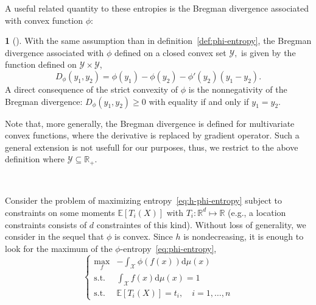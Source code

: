 \documentclass[english,sort&compress]{elsarticle}
\theoremstyle{definition}
\newtheorem{defn}{\protect\definitionname}
\theoremstyle{plain}
\theoremstyle{plain}
\providecommand{\definitionname}{Definition}
\def\dmu{\mathrm{d}\mu}
\def\Rset{\mathbb{R}}
\def\X{\mathcal{X}}
\def\Y{\mathcal{Y}}
\newcommand{\Esp}[1]{\mathbb{E}\left[ #1 \right]}
\begin{document}
A  useful  related  quantity  to  these  entropies  is  the  Bregman  divergence
associated with convex function $\phi$:
%
\begin{defn}[\cite{Bre67, Bas13}]
\label{def:Bregman}
  With the same assumption than in definition~\ref{def:phi-entropy}, the Bregman
  divergence  associated with $\phi$  defined on  a closed  convex set  $\Y,$ is
  given by the function defined on $\Y \times \Y$,
  \begin{equation}\label{eq:Bregman}
    D_\phi(y_1,y_2) = \phi(y_1) - \phi(y_2) - \phi'(y_2) \left(y_1-y_2\right).
  \end{equation}
  A direct consequence of the strict convexity of $\phi$ is the nonnegativity of
  the Bregman divergence:  $D_\phi(y_1,y_2) \ge 0$ with equality  if and only if
  $y_1 = y_2$.
\end{defn}

Note that,  more generally, the  Bregman divergence is defined  for multivariate
convex functions, where the derivative  is replaced by gradient operator. Such a
general extension  is not  usefull for  our purposes, thus,  we restrict  to the
above definition where $\Y \subseteq \Rset_+$.

\

Consider the  problem of maximizing  entropy~\eqref{eq:h-phi-entropy} subject to
constraints  on some moments  $\Esp{T_i(X)}$ with  $T_i: \Rset^d  \mapsto \Rset$
(e.g.,   a  location   constraints  consists   of  $d$   constraintes   of  this
kind). Without  loss of  generality, we  consider in the  sequel that  $\phi$ is
convex.  Since $h$ is nondecreasing, it is enough to look for the maximum of the
$\phi$-entropy~\eqref{eq:phi-entropy},
%
\begin{equation}\label{eq:MaxEnt}
\begin{cases}
\max_f & \displaystyle - \int_\X \phi(f(x)) \dmu(x)\\[5mm]
\text{s.t. } & \displaystyle \int_\X f(x) \dmu(x) = 1\\[5mm]
\text{s.t. } & \Esp{T_i(X)} = t_i, \quad i=1,\ldots,n
\end{cases}
\end{equation}
\end{document}
